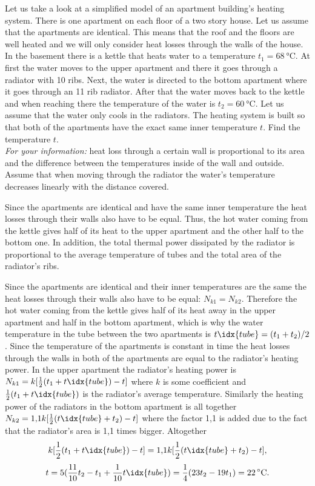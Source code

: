 {\ifEngStatement
Let us take a look at a simplified model of an apartment building’s heating system. There is one apartment on each floor of a two story house. Let us assume that the apartments are identical. This means that the roof and the floors are well heated and we will only consider heat losses through the walls of the house.\\
In the basement there is a kettle that heats water to a temperature $t_1=\SI{68}{\celsius}$. At first the water moves to the upper apartment and there it goes through a radiator with 10 ribs. Next, the water is directed to the bottom apartment where it goes through an 11 rib radiator. After that the water moves back to the kettle and when reaching there the temperature of the water is $t_2=\SI{60}{\celsius}$. Let us assume that the water only cools in the radiators. The heating system is built so that both of the apartments have the exact same inner temperature $t$. Find the temperature $t$. \\
\emph{For your information:} heat loss through a certain wall is proportional to its area and the difference between the temperatures inside of the wall and outside. Assume that when moving through the radiator the water’s temperature decreases linearly with the distance covered.
\fi


\ifEngHint
Since the apartments are identical and have the same inner temperature the heat losses through their walls also have to be equal. Thus, the hot water coming from the kettle gives half of its heat to the upper apartment and the other half to the bottom one. In addition, the total thermal power dissipated by the radiator is proportional to the average temperature of tubes and the total area of the radiator’s ribs.
\fi


\ifEngSolution
Since the apartments are identical and their inner temperatures are the same the heat losses through their walls also have to be equal: $N_{k1}=N_{k2}$. Therefore the hot water coming from the kettle gives half of its heat away in the upper apartment and half in the bottom apartment, which is why the water temperature in the tube between the two apartments is $t\idx{tube}=(t_1+t_2)/2$. Since the temperature of the apartments is constant in time the heat losses through the walls in both of the apartments are equal to the radiator’s heating power. In the upper apartment the radiator’s heating power is $N_{k1}=k[\frac{1}{2}(t_1+t\idx{tube})-t]$ where $k$ is some coefficient and $\frac{1}{2}(t_1+t\idx{tube})$ is the radiator’s average temperature. Similarly the heating power of the radiators in the bottom apartment is all together $N_{k2}=\text{1,1} k[\frac{1}{2}(t\idx{tube}+t_{2})-t]$ where the factor 1,1 is added due to the fact that the radiator’s area is 1,1 times bigger. Altogether
\[ k[\frac{1}{2}(t_1+t\idx{tube})-t]=\text{1,1}k[\frac{1}{2}(t\idx{tube}+t_{2})-t], \]
\[ t=5 (\frac{11}{10}t_2-t_1+\frac{1}{10}t\idx{tube})=\frac{1}{4}(23t_2-19t_1)=22\,^{\circ}\mathrm{C}. \]
\fi
}